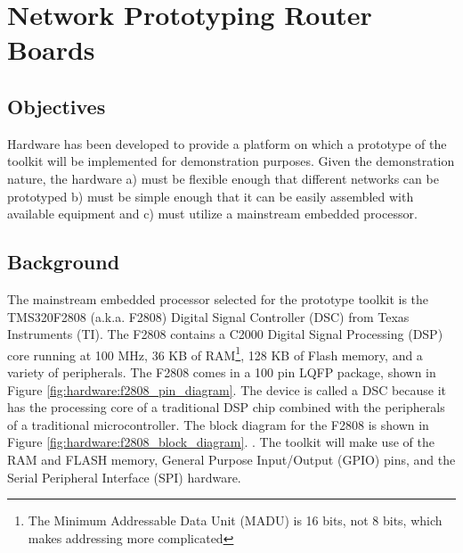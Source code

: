 \chapter{Network Prototyping Router Boards}\label{sec:hardware}

\section{Objectives}\label{sec:hardware:objectives}

Hardware has been developed to provide a platform on which a prototype of the toolkit will be implemented for demonstration purposes. Given the demonstration nature, the hardware a) must be flexible enough that different networks can be prototyped b) must be simple enough that it can be easily assembled with available equipment and c) must utilize a mainstream embedded processor.

\section{Background}\label{sec:hardware:background}

The mainstream embedded processor selected for the prototype toolkit is the TMS320F2808 (a.k.a. F2808) Digital Signal Controller (DSC) from Texas Instruments (TI). The F2808 contains a C2000 Digital Signal Processing (DSP) core running at 100 MHz, 36 KB of RAM\footnote{The Minimum Addressable Data Unit (MADU) is 16 bits, not 8 bits, which makes addressing more complicated}, 128 KB of Flash memory, and a variety of peripherals. The F2808 comes in a 100 pin LQFP package, shown in Figure \ref{fig:hardware:f2808_pin_diagram}. The device is called a DSC because it has the processing core of a traditional DSP chip combined with the peripherals of a traditional microcontroller. The block diagram for the F2808 is shown in Figure \ref{fig:hardware:f2808_block_diagram}. \cite{ref:2006-ti-f2808_users_guide}. The toolkit will make use of the RAM and FLASH memory, General Purpose Input/Output (GPIO) pins, and the Serial Peripheral Interface (SPI) hardware.

